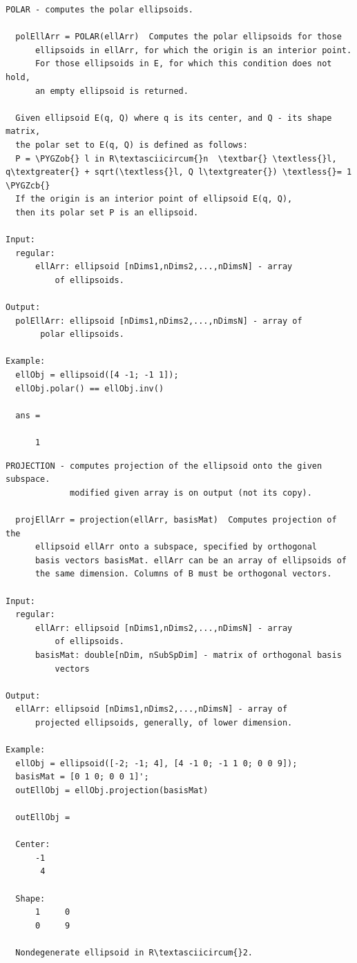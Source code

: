 \documentclass[letterpaper,10pt,english]{sphinxmanual}
\def\PYGZob{\char`\{}
\def\PYGZcb{\char`\}}
\begin{document}
\begin{Verbatim}[commandchars=\\\{\}]
POLAR - computes the polar ellipsoids.

  polEllArr = POLAR(ellArr)  Computes the polar ellipsoids for those
      ellipsoids in ellArr, for which the origin is an interior point.
      For those ellipsoids in E, for which this condition does not hold,
      an empty ellipsoid is returned.

  Given ellipsoid E(q, Q) where q is its center, and Q - its shape matrix,
  the polar set to E(q, Q) is defined as follows:
  P = \PYGZob{} l in R\textasciicircum{}n  \textbar{} \textless{}l, q\textgreater{} + sqrt(\textless{}l, Q l\textgreater{}) \textless{}= 1 \PYGZcb{}
  If the origin is an interior point of ellipsoid E(q, Q),
  then its polar set P is an ellipsoid.

Input:
  regular:
      ellArr: ellipsoid [nDims1,nDims2,...,nDimsN] - array
          of ellipsoids.

Output:
  polEllArr: ellipsoid [nDims1,nDims2,...,nDimsN] - array of
       polar ellipsoids.

Example:
  ellObj = ellipsoid([4 -1; -1 1]);
  ellObj.polar() == ellObj.inv()

  ans =

      1
\end{Verbatim}

\begin{Verbatim}[commandchars=\\\{\}]
PROJECTION - computes projection of the ellipsoid onto the given subspace.
             modified given array is on output (not its copy).

  projEllArr = projection(ellArr, basisMat)  Computes projection of the
      ellipsoid ellArr onto a subspace, specified by orthogonal
      basis vectors basisMat. ellArr can be an array of ellipsoids of
      the same dimension. Columns of B must be orthogonal vectors.

Input:
  regular:
      ellArr: ellipsoid [nDims1,nDims2,...,nDimsN] - array
          of ellipsoids.
      basisMat: double[nDim, nSubSpDim] - matrix of orthogonal basis
          vectors

Output:
  ellArr: ellipsoid [nDims1,nDims2,...,nDimsN] - array of
      projected ellipsoids, generally, of lower dimension.

Example:
  ellObj = ellipsoid([-2; -1; 4], [4 -1 0; -1 1 0; 0 0 9]);
  basisMat = [0 1 0; 0 0 1]';
  outEllObj = ellObj.projection(basisMat)

  outEllObj =

  Center:
      -1
       4

  Shape:
      1     0
      0     9

  Nondegenerate ellipsoid in R\textasciicircum{}2.
\end{Verbatim}
\end{document}
